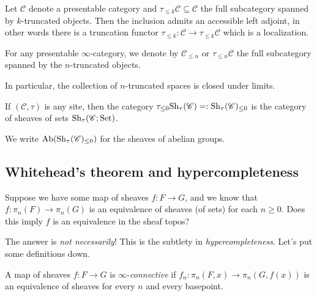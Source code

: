 \documentclass[11pt,openany]{book}
\begin{document}
\begin{proposition} \cite[5.5.6.18]{HTT}
Let $\mathscr{C}$ denote a presentable category and $\tau_{\le k} \mathscr{C} \subseteq \mathscr{C}$ the full subcategory spanned by $k$-truncated objects. Then the inclusion admits an accessible left adjoint, in other words there is a truncation functor $\tau_{\le k} : \mathscr{C} \to \tau_{\leq k} \mathscr{C}$ which is a localization.
\end{proposition}

\begin{notation}\label{nota:truncated-subcategory}
For any presentable $\infty$-category, we denote by $\mathscr{C}_{\le n}$ or $\tau_{\le n}\mathscr{C}$ the full subcategory spanned by the $n$-truncated objects.
\end{notation}

In particular, the collection of $n$-truncated spaces is closed under limits.

\begin{definition} If $(\mathscr{C},\tau)$ is any site, then the category $\tau_{\le 0}\mathrm{Sh}_\tau(\mathscr{C}) =: \mathrm{Sh}_\tau(\mathscr{C}) _{\le 0}$ is the category of sheaves of sets $\mathrm{Sh}_\tau(\mathscr{C};\mathrm{Set})$.
\end{definition}

\begin{notation} We write $\mathrm{Ab}(\mathrm{Sh}_\tau(\mathscr{C})_{\le 0})$ for the sheaves of abelian groups.
\end{notation}

\subsection{Whitehead's theorem and hypercompleteness}

\begin{question} Suppose we have some map of sheaves $f \colon F \to G$, and we know that $f \colon \pi_n(F) \to \pi_n(G)$ is an equivalence of sheaves (of sets) for each $n\ge 0$. Does this imply $f$ is an equivalence in the sheaf topos?
\end{question}

The answer is \emph{not necessarily}! This is the subtlety in \emph{hypercompleteness}. Let's put some definitions down.

\begin{definition}\label{def:infty-connective} A map of sheaves $f \colon F \to G$ is $\infty$-\emph{connective} if $f_n \colon \pi_n(F,x) \to \pi_n(G,f(x))$ is an equivalence of sheaves for every $n$ and every basepoint.
\end{definition}
\end{document}
